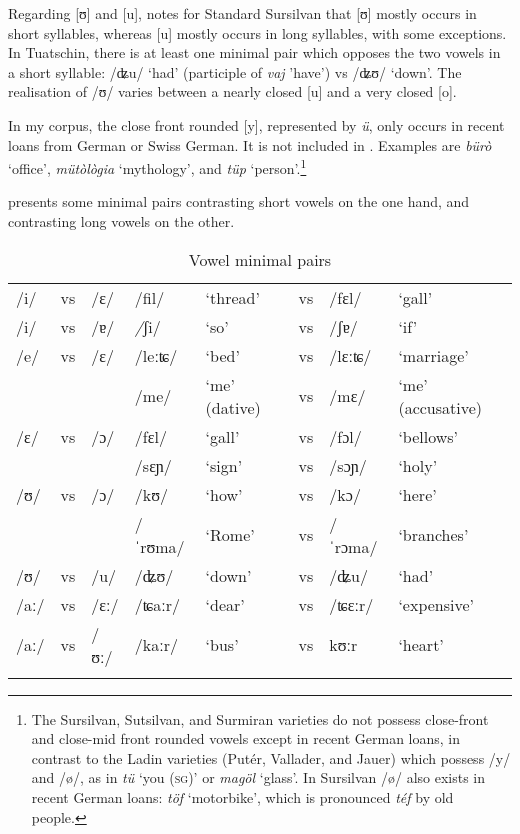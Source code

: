 Regarding [ʊ] and [u], \citet[130]{Liver2010} notes for Standard Sursilvan that [ʊ] mostly occurs in short syllables, whereas [u] mostly occurs in long syllables, with some exceptions. In Tuatschin, there is at least one minimal pair which opposes the two vowels in a short syllable: /ʥu/ `had' (participle of \textit{vaj} 'have') vs /ʥʊ/ `down'. The realisation of /ʊ/ varies between a nearly closed [u] and a very closed [o].

In my corpus, the close front rounded [y], represented by \textit{ü}, only occurs in recent loans from German or Swiss German. It is not included in . Examples are \textit{bürò} `office', \textit{mütòlògia} `mythology', and \textit{tüp} `person'.\footnote{The Sursilvan, Sutsilvan, and Surmiran varieties do not possess close-front and close-mid front rounded vowels except in recent German loans, in contrast to the Ladin varieties (Putér, Vallader, and Jauer) which possess /y/ and /ø/, as in \textit{tü} `you (\textsc{sg})' or \textit{magöl} `glass'. In Sursilvan /ø/ also exists in recent German loans: \textit{töf} `motorbike', which is pronounced \textit{téf} by old people.}

 presents some minimal pairs contrasting short vowels on the one hand, and contrasting long vowels on the other.

\begin{table}
	\caption{Vowel minimal pairs}
	\label{vmp}
	\begin{tabular}{llllllll}
	 \lsptoprule
		/i/&vs&/ɛ/& /fil/ &`thread' &vs& /fɛl/&`gall'\\
		/i/ & vs & /ɐ/ & \textit/ʃi/ & `so' & vs & /ʃɐ/ & `if'\\
		/e/&vs&/ɛ/& /leːʨ/ &`bed'&vs& /lɛːʨ/ &`marriage'\\
		&&&/me/ &`me' (dative) & vs & /mɛ/ & `me' (accusative) \\
		/ɛ/&vs&/ɔ/& /fɛl/ &`gall’ &vs & /fɔl/ & `bellows’\\
		&&& /sɛɲ/ &`sign’ & vs & /sɔɲ/ & `holy’\\
	
		/ʊ/ & vs & /ɔ/ & /kʊ/ & `how’ &vs& /kɔ/ &`here’\\
	&&&  /ˈrʊma/ & `Rome' &vs & /ˈrɔma/ & `branches'\\
	/ʊ/ & vs & /u/ &  /ʥʊ/ & `down' & vs & /ʥu/ & `had'\\
		/aː/ & vs & /ɛː/ &  /ʨaːr/ & `dear' & vs & /ʨɛːr/ & `expensive'\\
	/aː/ & vs & /ʊː/ & /kaːr/  & `bus' & vs & kʊːr & `heart'\\
		\lspbottomrule
	\end{tabular}
\end{table}


